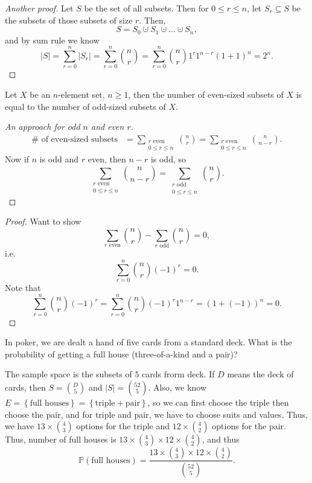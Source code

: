 \begin{proof}[Another proof]
    Let \(S\) be the set of all subsets. Then for \(0 \le r \le n\), let \(S_r \subseteq S\) be the subsets of those subsets of size \(r\). Then, 
    \[
        S = S_0 \cupdot S_1 \cupdot \dots \cupdot S_n,
    \]   
    and by sum rule we know 
    \[
        \vert S \vert = \sum_{r=0}^n \vert S_r \vert = \sum_{r=0}^n \binom{n}{r} = \sum_{r=0}^n \binom{n}{r} 1^r 1^{n-r} (1 + 1)^n = 2^n .    
    \]
\end{proof}

\begin{corollary}
    Let \(X\) be an \(n\)-element set, \(n \ge 1\), then the number of even-sized subsets of \(X\) is equal to the number of odd-sized subsets of \(X\).     
\end{corollary}
\begin{proof}[An approach for odd \(n\) and even \(r\)]
    \begin{align*}
        \# \text{ of even-sized subsets} &= \sum_{\substack{r \text{ even} \\ 0 \le r \le n }} \binom{n}{r} = \sum_{\substack{r \text{ even} \\ 0 \le r \le n }}  \binom{n}{n-r}.  
    \end{align*}
    Now if \(n\) is odd and \(r\) even, then \(n - r\) is odd, so 
    \[
       \sum_{\substack{r \text{ even} \\ 0 \le r \le n }}  \binom{n}{n-r} = \sum_{\substack{r \text{ odd} \\ 0 \le r \le n }}  \binom{n}{r}. 
    \]   
\end{proof}
\begin{proof}
    Want to show 
    \[
        \sum_{r \text{ even}} \binom{n}{r} - \sum_{r \text{ odd} } \binom{n}{r} = 0,  
    \]
    i.e. 
    \[
        \sum_{r=0}^n \binom{n}{r} (-1)^r = 0. 
    \]
    Note that 
    \[
        \sum_{r=0}^n \binom{n}{r} (-1)^r = \sum_{r=0}^n \binom{n}{r} (-1)^r 1^{n-r} = (1 + (-1))^n = 0. 
    \]
\end{proof}

\begin{eg}
    In poker, we are dealt a hand of five cards from a standard deck. What is the probability of getting a full house (three-of-a-kind and a pair)?
\end{eg}
\begin{explanation}
    The sample space is the subsets of \(5\) cards frorm deck. If \(D\) means the deck of cards, then \(S = \binom{D}{5}\) and \(\vert S \vert = \binom{52}{5} \). Also, we know \(E = \left\{ \text{full houses}  \right\} = \left\{ \text{triple} + \text{pair}   \right\} \), so we can first choose the triple then choose the pair, and for triple and pair, we have to choose suits and values. Thus, we have \(13 \times \binom{4}{3}\) options for the triple and \(12 \times \binom{4}{2}\) options for the pair. Thus, number of full houses is \(13 \times \binom{4}{3}\times  12 \times \binom{4}{2}\), and thus 
    \[
        \mathbb{P} (\text{full houses} ) = \frac{13 \times \binom{4}{3} \times 12 \times \binom{4}{2}}{\binom{52}{5}}.
    \]     
\end{explanation}

